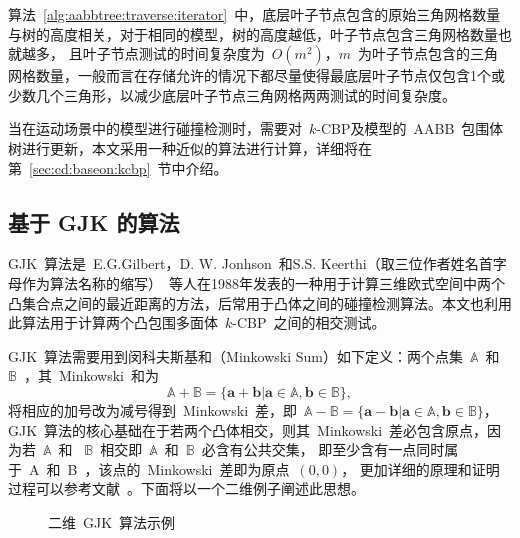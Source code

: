 算法~\ref{alg:aabbtree:traverse:iterator}~中，底层叶子节点包含的原始三角网格数量与树的高度相关，对于相同的模型，树的高度越低，叶子节点包含三角网格数量也就越多，
且叶子节点测试的时间复杂度为~$O(m^2)$，$m$~为叶子节点包含的三角网格数量，一般而言在存储允许的情况下都尽量使得最底层叶子节点仅包含1个或少数几个三角形，以减少底层叶子节点三角网格两两测试的时间复杂度。

当在运动场景中的模型进行碰撞检测时，需要对~$k$-CBP及模型的~AABB~包围体树进行更新，本文采用一种近似的算法进行计算，详细将在第~\ref{sec:cd:baseon:kcbp}~节中介绍。

\subsection{基于 GJK 的算法}
\label{subsec:kcbp:cd:gjk}

GJK~算法是~E.G.Gilbert，D. W. Jonhson~和S.S. Keerthi（取三位作者姓名首字母作为算法名称的缩写）~等人在1988年发表的一种用于计算三维欧式空间中两个凸集合点之间的最近距离的方法\cite{gilbert1988fast}，后常用于凸体之间的碰撞检测算法\cite{bergen1999fast}。本文也利用此算法用于计算两个凸包围多面体~$k$-CBP~之间的相交测试。

GJK~算法需要用到闵科夫斯基和（Minkowski Sum）如下定义：两个点集~$\mathbb{A}$~和~$\mathbb{B}$~，其~Minkowski~和为
\begin{equation}
  \mathbb{A} + \mathbb{B} = \{ \bm{a} + \bm{b} | \bm{a} \in \mathbb{A}, \bm{b} \in \mathbb{B}\},  
  \label{}
\end{equation}
将相应的加号改为减号得到~Minkowski~差，即~$\mathbb{A} - \mathbb{B} = \{ \bm{a} - \bm{b} | \bm{a} \in \mathbb{A}, \bm{b} \in \mathbb{B}\} $，GJK~算法的核心基础在于若两个凸体相交，则其~Minkowski~差必包含原点，因为若~$\mathbb{A}$~和
~$\mathbb{B}$~相交即~$\mathbb{A}$~和~$\mathbb{B}$~必含有公共交集，
即至少含有一点同时属于~A~和~B~，该点的~Minkowski~差即为原点~$(0, 0)$，
更加详细的原理和证明过程可以参考文献~。下面将以一个二维例子阐述此思想。

\begin{figure}[htb]
\centering
{} 
\caption{二维~GJK~算法示例}
\label{fig:gjk:example:2d}
\end{figure}

